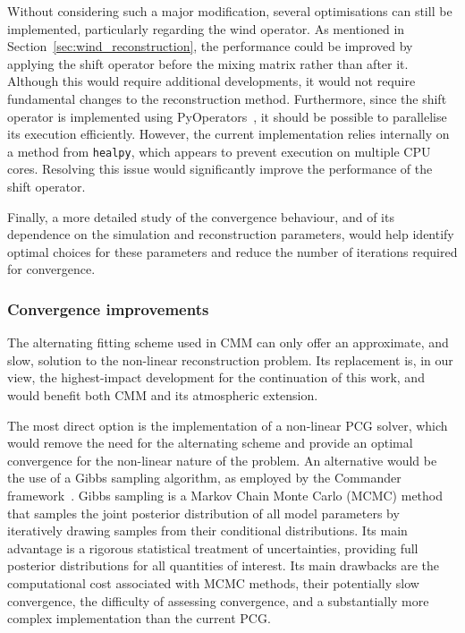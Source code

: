 \documentclass[a4paper,11pt]{article}
\begin{document}
Without considering such a major modification, several optimisations can still be implemented, particularly regarding the wind operator. As mentioned in Section~\ref{sec:wind_reconstruction}, the performance could be improved by applying the shift operator before the mixing matrix rather than after it. Although this would require additional developments, it would not require fundamental changes to the reconstruction method.
Furthermore, since the shift operator is implemented using PyOperators~\cite{PyOperators}, it should be possible to parallelise its execution efficiently. However, the current implementation relies internally on a method from \texttt{healpy}, which appears to prevent execution on multiple CPU cores. Resolving this issue would significantly improve the performance of the shift operator.

Finally, a more detailed study of the convergence behaviour, and of its dependence on the simulation and reconstruction parameters, would help identify optimal choices for these parameters and reduce the number of iterations required for convergence.

\subsubsection{Convergence improvements}

The alternating fitting scheme used in CMM can only offer an approximate, and slow, solution to the non-linear reconstruction problem. Its replacement is, in our view, the highest-impact development for the continuation of this work, and would benefit both CMM and its atmospheric extension.

The most direct option is the implementation of a non-linear PCG solver, which would remove the need for the alternating scheme and provide an optimal convergence for the non-linear nature of the problem. An alternative would be the use of a Gibbs sampling algorithm, as employed by the Commander framework~\cite{Commander2008}. Gibbs sampling is a Markov Chain Monte Carlo (MCMC) method that samples the joint posterior distribution of all model parameters by iteratively drawing samples from their conditional distributions. Its main advantage is a rigorous statistical treatment of uncertainties, providing full posterior distributions for all quantities of interest. Its main drawbacks are the computational cost associated with MCMC methods, their potentially slow convergence, the difficulty of assessing convergence, and a substantially more complex implementation than the current PCG.
\end{document}
